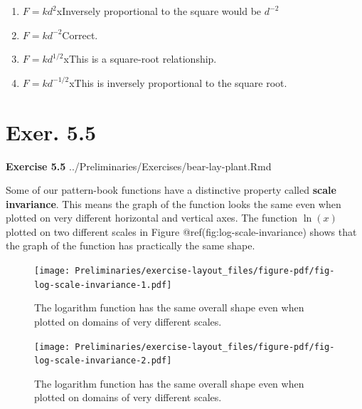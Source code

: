 \documentclass[
  letterpaper,
  DIV=11,
  numbers=noendperiod,
  oneside]{article}
\providecommand{\tightlist}{%
  \setlength{\itemsep}{0pt}\setlength{\parskip}{0pt}}\usepackage{longtable,booktabs,array}
\begin{document}
\begin{multicols}{2}
\begin{enumerate}
\def\labelenumi{\roman{enumi}.}
\tightlist
\item
  {\(F = k d^{2}\){xInversely proportional to the square would be
  \(d^{-2}\)}}\\
\item
  {\(F = kd^{-2}\){Correct.~}}\\
\item
  {\(F = k d^{1/2}\){xThis is a square-root relationship.}}\\
\item
  {\(F = k d^{-1/2}\){xThis is inversely proportional to the square
  root.}}
\end{enumerate}

\hypertarget{exer.-5.5}{%
\section*{Exer. 5.5}\label{exer.-5.5}}

\textbf{Exercise 5.5} ../Preliminaries/Exercises/bear-lay-plant.Rmd

Some of our pattern-book functions have a distinctive property called
\textbf{scale invariance}. This means the graph of the function looks
the same even when plotted on very different horizontal and vertical
axes. The function \(\ln(x)\) plotted on two different scales in Figure
@ref(fig:log-scale-invariance) shows that the graph of the function has
practically the same shape.

\begin{figure}

{\centering \texttt{[image: Preliminaries/exercise-layout\_files/figure-pdf/fig-log-scale-invariance-1.pdf]}

}

\caption{\label{fig-log-scale-invariance-1}The logarithm function has
the same overall shape even when plotted on domains of very different
scales.}

\end{figure}

\begin{figure}

{\centering \texttt{[image: Preliminaries/exercise-layout\_files/figure-pdf/fig-log-scale-invariance-2.pdf]}

}

\caption{\label{fig-log-scale-invariance-2}The logarithm function has
the same overall shape even when plotted on domains of very different
scales.}


\end{figure}
\end{multicols}
\end{document}
